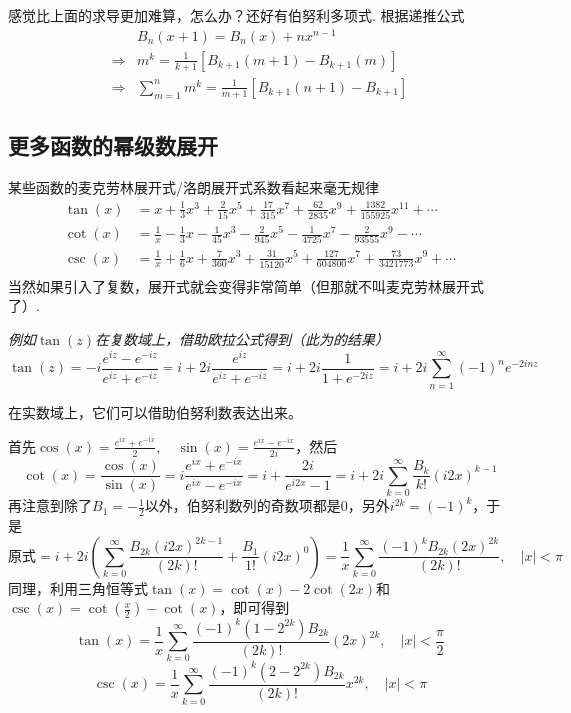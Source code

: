 \documentclass[main.tex]{subfiles}
\begin{document}
感觉比上面的求导更加难算，怎么办？还好有伯努利多项式. 根据递推公式
\begin{align*}
    & B_n(x+1) = B_n(x) + nx^{n-1} \\
    \Longrightarrow & m^k = \frac{1}{k+1}\left[B_{k+1}(m+1) - B_{k+1}(m)\right] \\
    \Longrightarrow & \sum_{m=1}^{n} m^k = \frac{1}{m+1}\left[B_{k+1}(n+1) - B_{k+1}\right]
\end{align*}


\subsection{更多函数的幂级数展开}

某些函数的麦克劳林展开式/洛朗展开式系数看起来毫无规律
\begin{align*}
    \tan(x) &= x + \frac{1}{3}x^3 + \frac{2}{15}x^5 + \frac{17}{315}x^7 + \frac{62}{2835}x^9+ \frac{1382}{155925}x^{11} + \cdots \\
    \cot(x) &= \frac{1}{x} - \frac{1}{3}x - \frac{1}{45}x^3 - \frac{2}{945}x^5 - \frac{1}{4725}x^7 - \frac{2}{93555}x^9 - \cdots \\
    \csc(x) &= \frac{1}{x} + \frac{1}{6}x + \frac{7}{360}x^3 + \frac{31}{15120}x^5 + \frac{127}{604800}x^7 + \frac{73}{3421773}x^9 + \cdots \\
\end{align*}
当然如果引入了复数，展开式就会变得非常简单（但那就不叫麦克劳林展开式了）.

\vspace{0.5cm}
\textit{
例如\(\tan(z)\)在复数域上，借助欧拉公式得到（此为的结果）
\[ \tan(z) = -i\frac{e^{iz}-e^{-iz}}{e^{iz}+e^{-iz}} = i+2i\frac{e^{iz}}{e^{iz}+e^{-iz}}=i+2i\frac{1}{1+e^{-2iz}}=i+2i\sum_{n=1}^{\infty}(-1)^ne^{-2inz}\]
}

在实数域上，它们可以借助伯努利数表达出来。

首先\(\displaystyle{\cos(x) = \frac{e^{ix}+e^{-ix}}2, \quad \sin(x) = \frac{e^{ix}-e^{-ix}}{2i}}\)，然后
\[ \cot(x) = \frac{\cos(x)}{\sin(x)} = i\frac{e^{ix} + e^{-ix}}{e^{ix} - e^{-ix}} = i + \frac{2i}{e^{i2x} - 1} = i+2i\sum_{k=0}^{\infty}\frac{B_k}{k!}(i2x)^{k-1}\]
再注意到除了\(B_1=-\frac{1}{2}\)以外，伯努利数列的奇数项都是0，另外\(i^{2k} = (-1)^k\)，于是
\[ \mbox{原式}= i + 2i\left(\sum_{k=0}^{\infty}\frac{B_{2k}(i2x)^{2k-1}}{(2k)!}+\frac{B_1}{1!}(i2x)^0 \right) = \frac{1}{x}\sum_{k=0}^{\infty}\frac{(-1)^k B_{2k} (2x)^{2k}}{(2k)!}, \quad |x|<{\pi}\]
同理，利用三角恒等式\(\tan(x) = \cot(x) - 2\cot(2x)\)和\(\csc(x) = \cot\left(\frac{x}{2}\right)-\cot(x)\)，即可得到
\[ \tan(x)=\frac{1}{x}\sum_{k=0}^{\infty}\frac{(-1)^{k}(1-2^{2k})B_{2k}}{(2k)!}(2x)^{2k}, \quad |x|<\frac {\pi}{2}\]
\[\csc(x)=\frac{1}{x}\sum_{k=0}^{\infty}\frac{(-1)^{k}(2-2^{2k})B_{2k}}{(2k)!}x^{2k}, \quad |x|<\pi \]
\end{document}
